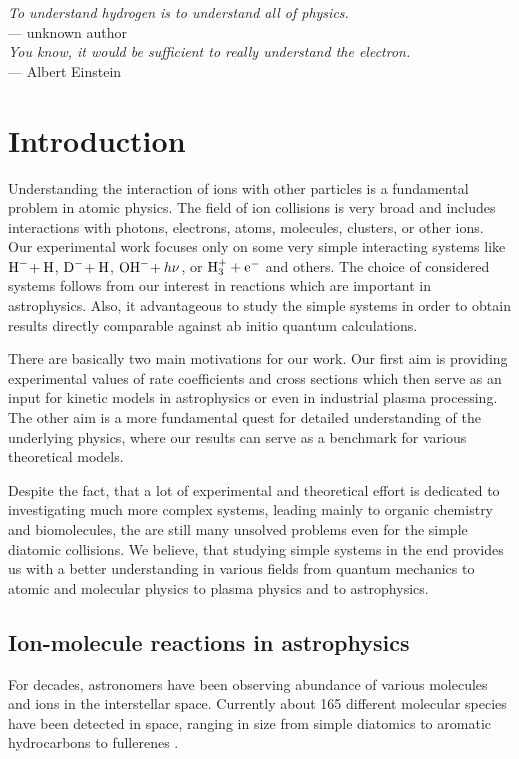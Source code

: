 \begin{flushright}
\textsl{To understand hydrogen is to understand all of physics.}\\
 \medskip{}
 --- unknown author \\
\bigskip{}
\textsl{You know, it would be sufficient to really understand the electron.}\\
 \medskip{}
 --- Albert Einstein
\par\end{flushright}

\bigskip{}
\begingroup
\let\clearpage\relax
\let\cleardoublepage\relax


\chapter{Introduction}

\label{ch:Introduction}
Understanding the interaction of ions with other particles is a
fundamental problem in atomic physics. The field of ion collisions
is very broad and includes interactions with photons, electrons,
atoms, molecules, clusters, or other ions. Our experimental work
focuses only on some very simple interacting systems like
${\text{H}^-\!}+{\text{H}}$,
${\text{D}^-\!}+{\text{H}}$, ${\text{OH}^-\!}+h\nu$, or ${\text{H}^+_3}+{\text{e}^-}$ and others. The
choice of considered systems follows from our interest in reactions
which are important in astrophysics. Also, it advantageous to study
the simple systems in order to obtain results directly comparable
against ab initio quantum calculations.

There are basically two main motivations for our work. Our first
aim is providing experimental values of rate coefficients and
cross sections which then serve as an input for kinetic models
in astrophysics or even in industrial plasma processing. The
other aim is a more fundamental quest for detailed understanding
of the underlying physics, where our results can serve as a benchmark
for various theoretical models.

Despite the fact, that a lot of experimental and theoretical effort
is dedicated to investigating much more complex systems, leading
mainly to organic chemistry and biomolecules, the are still many
unsolved problems even for the simple diatomic collisions. We
believe, that studying simple systems in the end provides
us with a better understanding in various fields from quantum mechanics
to atomic and molecular physics to plasma physics and to astrophysics.

\section{Ion-molecule reactions in astrophysics}
For decades, astronomers have been observing abundance of
various molecules and ions in the interstellar space. Currently
about 165 different molecular species have been detected in space, ranging
in size from simple diatomics to aromatic hydrocarbons to fullerenes 
\citep{muller2001,muller2005,cdms}.


